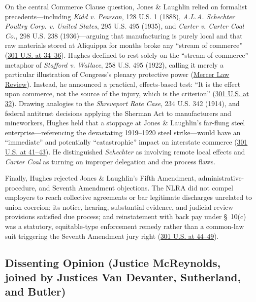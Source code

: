 \documentclass[12pt]{article}
\begin{document}
On the central Commerce Clause question, Jones \& Laughlin relied on formalist precedents---including \textit{Kidd v. Pearson}, 128 U.S. 1 (1888), \textit{A.L.A. Schechter Poultry Corp. v. United States}, 295 U.S. 495 (1935), and \textit{Carter v. Carter Coal Co.}, 298 U.S. 238 (1936)---arguing that manufacturing is purely local and that raw materials stored at Aliquippa for months broke any ``stream of commerce'' (\href{https://supreme.justia.com/cases/federal/us/301/1/}{301 U.S. at 34--36}). Hughes declined to rest solely on the ``stream of commerce'' metaphor of \textit{Stafford v. Wallace}, 258 U.S. 495 (1922), calling it merely a particular illustration of Congress's plenary protective power (\href{https://digitalcommons.law.mercer.edu/cgi/viewcontent.cgi?article=2003&context=jour_mlr}{Mercer Law Review}). Instead, he announced a practical, effects-based test: ``It is the effect upon commerce, not the source of the injury, which is the criterion'' (\href{https://supreme.justia.com/cases/federal/us/301/1/}{301 U.S. at 32}). Drawing analogies to the \textit{Shreveport Rate Case}, 234 U.S. 342 (1914), and federal antitrust decisions applying the Sherman Act to manufacturers and mineworkers, Hughes held that a stoppage at Jones \& Laughlin's far-flung steel enterprise---referencing the devastating 1919--1920 steel strike---would have an ``immediate'' and potentially ``catastrophic'' impact on interstate commerce (\href{https://supreme.justia.com/cases/federal/us/301/1/}{301 U.S. at 41--43}). He distinguished \textit{Schechter} as involving remote local effects and \textit{Carter Coal} as turning on improper delegation and due process flaws.

Finally, Hughes rejected Jones \& Laughlin's Fifth Amendment, administrative-procedure, and Seventh Amendment objections. The NLRA did not compel employers to reach collective agreements or bar legitimate discharges unrelated to union coercion; its notice, hearing, substantial-evidence, and judicial-review provisions satisfied due process; and reinstatement with back pay under \S~10(c) was a statutory, equitable-type enforcement remedy rather than a common-law suit triggering the Seventh Amendment jury right (\href{https://supreme.justia.com/cases/federal/us/301/1/}{301 U.S. at 44--49}).

\subsection{Dissenting Opinion (Justice McReynolds, joined by Justices Van Devanter, Sutherland, and Butler)}
\end{document}
